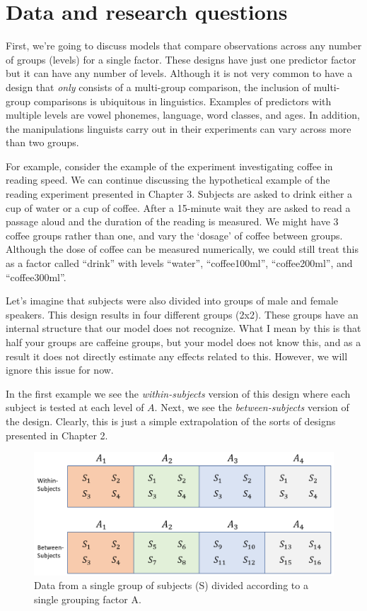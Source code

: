 \documentclass[
]{book}
\begin{document}
\hypertarget{data-and-research-questions-3}{%
\section{Data and research questions}\label{data-and-research-questions-3}}

First, we're going to discuss models that compare observations across any number of groups (levels) for a single factor. These designs have just one predictor factor but it can have any number of levels. Although it is not very common to have a design that \emph{only} consists of a multi-group comparison, the inclusion of multi-group comparisons is ubiquitous in linguistics. Examples of predictors with multiple levels are vowel phonemes, language, word classes, and ages. In addition, the manipulations linguists carry out in their experiments can vary across more than two groups.

For example, consider the example of the experiment investigating coffee in reading speed. We can continue discussing the hypothetical example of the reading experiment presented in Chapter 3. Subjects are asked to drink either a cup of water or a cup of coffee. After a 15-minute wait they are asked to read a passage aloud and the duration of the reading is measured. We might have 3 coffee groups rather than one, and vary the `dosage' of coffee between groups. Although the dose of coffee can be measured numerically, we could still treat this as a factor called ``drink'' with levels ``water'', ``coffee100ml'', ``coffee200ml'', and ``coffee300ml''.

Let's imagine that subjects were also divided into groups of male and female speakers. This design results in four different groups (2x2). These groups have an internal structure that our model does not recognize. What I mean by this is that half your groups are caffeine groups, but your model does not know this, and as a result it does not directly estimate any effects related to this. However, we will ignore this issue for now.

In the first example we see the \emph{within-subjects} version of this design where each subject is tested at each level of \(A\). Next, we see the \emph{between-subjects} version of the design. Clearly, this is just a simple extrapolation of the sorts of designs presented in Chapter 2.

\begin{figure}

{\centering \includegraphics[width=0.8\linewidth]{./images/design_ch4_1} 

}

\caption{Data from a single group of subjects (S) divided according to a single grouping factor A.}\label{fig:F4-designfig}
\end{figure}
\end{document}
